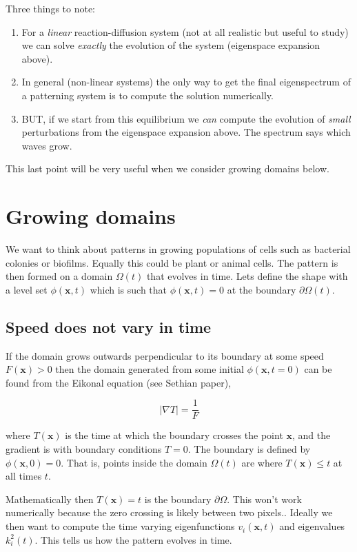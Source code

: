 \documentclass{report}
\renewcommand{\vec}[1]{\mathbf{#1}}
\begin{document}
Three things to note:
\begin{enumerate}
\item For a \textit{linear} reaction-diffusion system (not at all realistic
but useful to study) we can solve \textit{exactly} the evolution of the system
(eigenspace expansion above).
\item In general (non-linear systems) the only way to get the final eigenspectrum 
of a patterning system is to compute the solution numerically.
\item BUT, if we start from this equilibrium we \textit{can} compute the
evolution of \textit{small} perturbations from the eigenspace expansion above.
The spectrum says which waves grow.
\end{enumerate}

This last point will be very useful when we consider growing domains below.

\section{Growing domains}
We want to think about patterns in growing populations of cells such as
bacterial colonies or biofilms. Equally this could be plant or animal cells. The
pattern is then formed on a domain $\Omega(t)$ that evolves in time. Lets define
the shape with a level set $\phi(\vec{x},t)$ which is such that $\phi(\vec{x},t)=0$
at the boundary $\partial \Omega(t)$.

\subsection{Speed does not vary in time}
If the domain grows outwards perpendicular to its boundary at some speed
$F(\vec{x})>0$ then the domain generated from some initial $\phi(\vec{x},t=0)$ can be found from the Eikonal
equation (see Sethian paper),

\begin{equation}
\left| \nabla T \right| = \frac{1}{F}
\end{equation}

where $T(\vec{x})$ is the time at which the boundary crosses the point
$\vec{x}$, and the gradient is with boundary conditions $T=0$. 
The boundary is defined by $\phi(\vec{x},0)=0$.
That is, points inside the domain $\Omega(t)$ are where
$T(\vec{x})\le t$ at all times $t$.

Mathematically then $T(\vec{x})=t$ is the boundary $\partial \Omega$. This
won't work numerically because the zero crossing is likely between two pixels..
Ideally we then want to compute the time varying eigenfunctions $v_i(\vec{x},t)$
and eigenvalues $k_i^2(t)$. This tells us how the pattern evolves in time.
\end{document}
